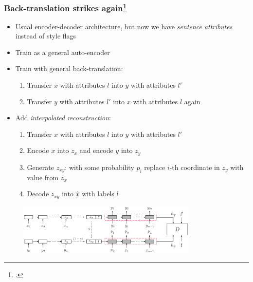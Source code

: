 \documentclass[10pt]{beamer}
\begin{document}
\begin{frame}
\frametitle{Back-translation strikes again\footcite{StyleTransferViaSoftBackTranslation}}
\begin{itemize}
    \item Usual encoder-decoder architecture, but now we have \textit{sentence attributes} instead of style flags
    \item Train as a general auto-encoder
    \item Train with general back-translation:
    \begin{enumerate}
        \item Transfer $x$ with attributes $l$ into $y$ with attributes $l'$
        \item Transfer $y$ with attributes $l'$ into $x$ with attributes $l$ again
    \end{enumerate}
    \item Add \textit{interpolated reconstruction}:
    \begin{enumerate}
        \item Transfer $x$ with attributes $l$ into $y$ with attributes $l'$
        \item Encode $x$ into $z_x$ and encode $y$ into $z_y$
        \item Generate $z_{xy}$: with some probability $p_i$ replace $i$-th coordinate in $z_y$ with value from $z_x$
        \item Decode $z_{xy}$ into $\hat{x}$ with labels $l$
    \end{enumerate}
\end{itemize}
\begin{figure}
\centering
\includegraphics[width=0.8\textwidth]{images/interpolated-bt-architecture}
\end{figure}

\end{frame}
\end{document}
